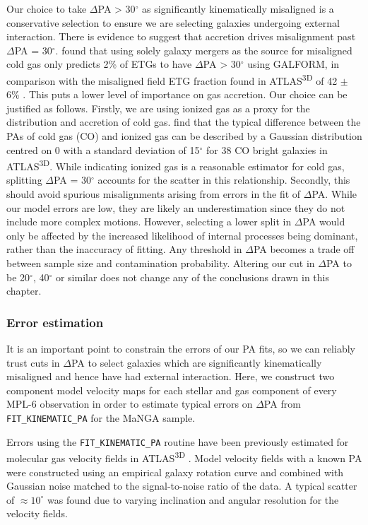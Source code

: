 Our choice to take $\Delta$PA > 30$^{\circ}$ as significantly kinematically misaligned is a conservative selection to ensure we are selecting galaxies undergoing external interaction. There is evidence to suggest that accretion drives misalignment past $\Delta$PA = 30$^{\circ}$. \citet{lagos2015} found that using solely galaxy mergers as the source for misaligned cold gas only predicts 2\% of ETGs to have $\Delta$PA > 30$^{\circ}$ using GALFORM, in comparison with the misaligned field ETG fraction found in ATLAS\textsuperscript{3D} of 42 $\pm$ 6\%  \citep{davis2011a}. This puts a lower level of importance on gas accretion. Our choice can be justified as follows. Firstly, we are using ionized gas as a proxy for the distribution and accretion of cold gas. \citet{davis2011a} find that the typical difference between the PAs of cold gas (CO) and ionized gas can be described by a Gaussian distribution centred on 0 with a standard deviation of 15$^{\circ}$ for 38 CO bright galaxies in ATLAS\textsuperscript{3D}. While indicating ionized gas is a reasonable estimator for cold gas, splitting $\Delta$PA = 30$^{\circ}$ accounts for the scatter in this relationship. Secondly, this should avoid spurious misalignments arising from errors in the fit of $\Delta$PA. While our model errors are low, they are likely an underestimation since they do not include more complex motions. However, selecting a lower split in $\Delta$PA would only be affected by the increased likelihood of internal processes being dominant, rather than the inaccuracy of fitting. Any threshold in $\Delta$PA becomes a trade off between sample size and contamination probability. Altering our cut in $\Delta$PA to be 20$^{\circ}$, 40$^{\circ}$ or similar does not change any of the conclusions drawn in this chapter.

\subsubsection{Error estimation}
It is an important point to constrain the errors of our PA fits, so we can reliably trust cuts in $\Delta$PA to select galaxies which are significantly kinematically misaligned and hence have had external interaction. Here, we construct two component model velocity maps for each stellar and gas component of every MPL-6 observation in order to estimate typical errors on $\Delta$PA from \texttt{FIT\_KINEMATIC\_PA} for the MaNGA sample. 

Errors using the \texttt{FIT\_KINEMATIC\_PA} routine have been previously estimated for molecular gas velocity fields in ATLAS\textsuperscript{3D} \citep{davis2011a}. Model velocity fields with a known PA were constructed using an empirical galaxy rotation curve and combined with Gaussian noise matched to the signal-to-noise ratio of the data. A typical scatter of $\approx10^{\circ}$ was found due to varying inclination and angular resolution for the velocity fields.

